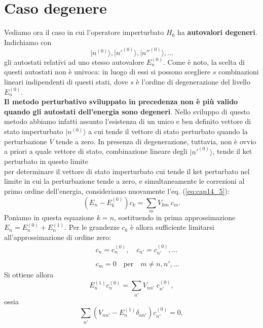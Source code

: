 \section{Caso degenere}
Vediamo ora il caso in cui l'operatore imperturbato $H_0$ ha \textbf{autovalori degeneri}. Indichiamo con
\begin{equation}
\vert n^{(0)} \rangle, \vert n'^{(0)} \rangle, \vert n''^{(0)} \rangle, \dots
\end{equation}
gli autostati relativi ad uno stesso autovalore $E_n ^{(0)}$. Come è noto, la scelta di questi autostati non è univoca: in luogo di essi si possono scegliere $s$ combinazioni lineari indipendenti di questi stati, dove $s$ è l'ordine di degenerazione del livello $E_n ^{(0)}$.\\
\textbf{Il metodo perturbativo sviluppato in precedenza non è più valido quando gli autostati dell'energia sono degeneri}. Nello sviluppo di questo metodo abbiamo infatti assunto l'esistenza di un unico e ben definito vettore di stato imperturbato $\vert n ^{(0)}\rangle$ a cui tende il vettore di stato perturbato quando la perturbazione $V$ tende a zero. In presenza di degenerazione, tuttavia, non è ovvio a priori a quale vettore di stato, combinazione lineare degli $\vert n'^{(0)}\rangle$, tende il ket perturbato in questo limite\\
per determinare il vettore di stato imperturbato cui tende il ket perturbato nel limite in cui la perturbazione tende a zero, e simultaneamente le correzioni al primo ordine dell'energia, consideriamo nuovamente l'eq. (\ref{eq:cap14_5}):
\begin{equation}
(E_n - E_k ^{(0)}) c_k = \sum _m V_{km}\ c_m.
\end{equation}
Poniamo in questa equazione $k=n$, sostituendo in prima approssimazione $E_n = E_n ^{(0)}+E_n ^{(1)}$. Per le grandezze $c_k$ è allora sufficiente limitarsi all'approssimazione di ordine zero:
\begin{eqnarray}
& &c_n = c_n ^{(0)}, \quad c_{n'} = c_{n'} ^{(0)},\dots \nonumber \\
\\
& &c_m =0 \quad \textrm{per}\quad m\neq n, n', \dots \nonumber
\end{eqnarray}
Si ottiene allora
\begin{equation}
E_n ^{(1)}c_n ^{(0)}= \sum _{n'} V_{n n'}\ c_{n'} ^{(0)},
\end{equation}
ossia
\begin{equation}
\sum _{n'} \left( V_{n n'}- E_n ^{(1)}\delta _{nn'} \right) c_{n'} ^{(0)}=0,
\label{eq:cap14_13}
\end{equation}
